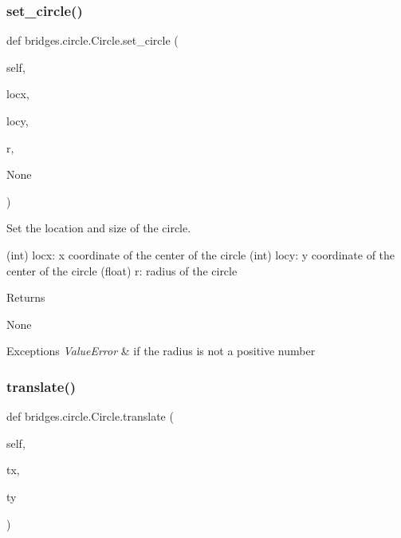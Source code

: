 \mbox{\label{classbridges_1_1circle_1_1_circle_a42b7ccd17017ca328371ce27e1bdbffe}} 
\subsubsection{\texorpdfstring{set\+\_\+circle()}{set\_circle()}}
{\footnotesize\ttfamily def bridges.\+circle.\+Circle.\+set\+\_\+circle (\begin{DoxyParamCaption}\item[{}]{self,  }\item[{}]{locx,  }\item[{}]{locy,  }\item[{}]{r,  }\item[{}]{None }\end{DoxyParamCaption})}



Set the location and size of the circle. 

(int) locx\+: x coordinate of the center of the circle (int) locy\+: y coordinate of the center of the circle (float) r\+: radius of the circle \begin{DoxyReturn}{Returns}


None
\end{DoxyReturn}

\begin{DoxyExceptions}{Exceptions}
{\em Value\+Error} & if the radius is not a positive number \\
\hline
\end{DoxyExceptions}
\mbox{\label{classbridges_1_1circle_1_1_circle_ad56c923b12df5ce2db3588175ce3b646}} 
\subsubsection{\texorpdfstring{translate()}{translate()}}
{\footnotesize\ttfamily def bridges.\+circle.\+Circle.\+translate (\begin{DoxyParamCaption}\item[{}]{self,  }\item[{}]{tx,  }\item[{}]{ty }\end{DoxyParamCaption})}



